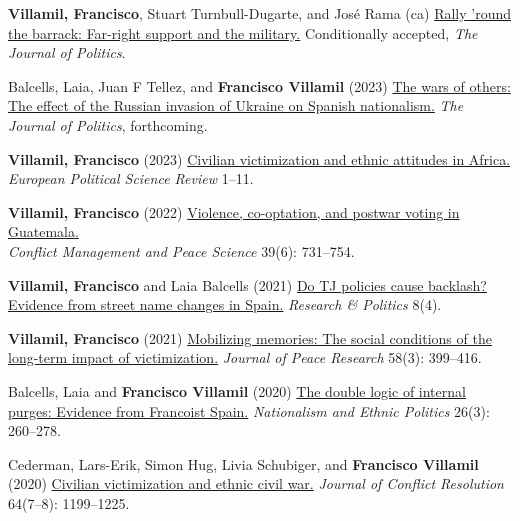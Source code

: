 \documentclass[a4paper, 12pt]{article}
\begin{document}
\begin{etaremune}[leftmargin=12pt, itemsep=0pt]
\item \textbf{Villamil, Francisco}, Stuart Turnbull-Dugarte, and José Rama (ca) \href{}{Rally 'round the barrack: Far-right support and the military.} Conditionally accepted, \textit{The Journal of Politics}.
\item Balcells, Laia, Juan F Tellez, and \textbf{Francisco Villamil} (2023) \href{https://www.laiabalcells.com/wp-content/uploads/Ukraine_and_Spanish_Nationalism.pdf}{The wars of others: The effect of the Russian invasion of Ukraine on Spanish nationalism.} \textit{The Journal of Politics}, forthcoming.
\item \textbf{Villamil, Francisco} (2023) \href{https://doi.org/10.1017/S1755773923000097}{Civilian victimization and ethnic attitudes in Africa.}\\\textit{European Political Science Review} 1--11.
\item \textbf{Villamil, Francisco} (2022) \href{https://journals.sagepub.com/doi/full/10.1177/07388942211066539}{Violence, co-optation, and postwar voting in Guatemala.}\\\textit{Conflict Management and Peace Science} 39(6): 731--754.
\item \textbf{Villamil, Francisco} and Laia Balcells (2021) \href{https://journals.sagepub.com/doi/full/10.1177/20531680211058550}{Do TJ policies cause backlash? Evidence from street name changes in Spain.} \textit{Research \& Politics} 8(4).
\item \textbf{Villamil, Francisco} (2021) \href{https://doi.org/10.1177/0022343320912816}{Mobilizing memories: The social conditions of the long-term impact of victimization.} \textit{Journal of Peace Research} 58(3): 399--416.
\item Balcells, Laia and \textbf{Francisco Villamil} (2020) \href{https://doi.org/10.1080/13537113.2020.1795451}{The double logic of internal purges: Evidence from Francoist Spain.} \textit{Nationalism and Ethnic Politics} 26(3): 260--278.
\item Cederman, Lars-Erik, Simon Hug, Livia Schubiger, and \textbf{Francisco Villamil} (2020) \href{https://doi.org/10.1177/0022002719898873}{Civilian victimization and ethnic civil war.} \textit{Journal of Conflict Resolution} 64(7--8): 1199--1225.
\end{etaremune}
\end{document}
